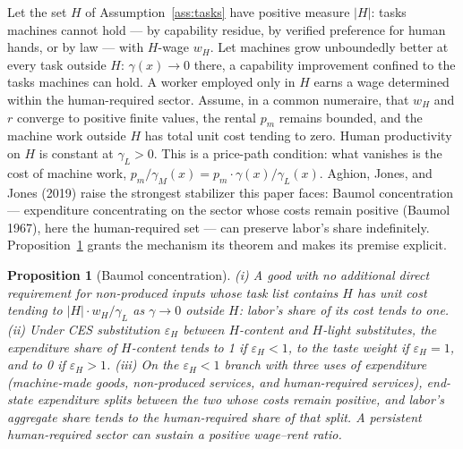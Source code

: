 \documentclass[12pt]{article}
\theoremstyle{plain}
\newtheorem{proposition}{Proposition}
\theoremstyle{definition}
\theoremstyle{remark}
\begin{document}
Let the set $H$ of Assumption~\ref{ass:tasks} have positive measure $|H|$: tasks machines cannot hold --- by capability residue, by verified preference for human hands, or by law --- with $H$-wage $w_H$. Let machines grow unboundedly better at every task outside $H$: $\gamma (x) \to 0$ there, a capability improvement confined to the tasks machines can hold. A worker employed only in $H$ earns a wage determined within the human-required sector. Assume, in a common numeraire, that $w_H$ and $r$ converge to positive finite values, the rental $p_m$ remains bounded, and the machine work outside $H$ has total unit cost tending to zero. Human productivity on $H$ is constant at $\gamma_L>0$. This is a price-path condition: what vanishes is the cost of machine work, $p_m/\gamma _M(x) = p_m\cdot \gamma (x)/\gamma _L(x)$. Aghion, Jones, and Jones (2019) raise the strongest stabilizer this paper faces: Baumol concentration --- expenditure concentrating on the sector whose costs remain positive (Baumol 1967), here the human-required set --- can preserve labor's share indefinitely. Proposition~\ref{prop:E.1} grants the mechanism its theorem and makes its premise explicit.

\begin{proposition}[Baumol concentration]\label{prop:E.1}
(i) A good with no additional direct requirement for non-produced inputs whose task list contains $H$ has unit cost tending to $|H|\cdot w_H/\gamma _L$ as $\gamma \to 0$ outside $H$: labor's share of its cost tends to one. (ii) Under CES substitution $\varepsilon _H$ between $H$-content and $H$-light substitutes, the expenditure share of $H$-content tends to 1 if $\varepsilon _H < 1$, to the taste weight if $\varepsilon _H = 1$, and to 0 if $\varepsilon _H > 1$. (iii) On the $\varepsilon _H < 1$ branch with three uses of expenditure (machine-made goods, non-produced services, and human-required services), end-state expenditure splits between the two whose costs remain positive, and labor's aggregate share tends to the human-required share of that split. A persistent human-required sector can sustain a positive wage--rent ratio.
\end{proposition}
\end{document}
